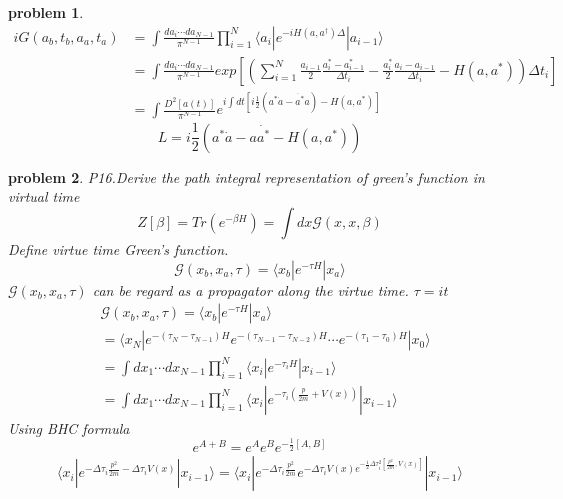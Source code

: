 \documentclass[a4paper,11pt]{article}
\newtheorem{problem}{problem}[subsection]
\begin{document}
\begin{problem}
\begin{equation*}
\begin{split}
     iG(a_b,t_b,a_a,t_a)&=\int\frac{da_i\cdots da_{N-1}}{\pi^{N-1}}\prod_{i=1}^{N}\langle a_i|e^{-iH(a,a^\dag)\Delta}|a_{i-1}\rangle\\
       &=\int\frac{da_i\cdots da_{N-1}}{\pi^{N-1}}exp\left[\left(\sum_{i=1}^{N}\frac{a_{i-1}}{2}\frac{a_i^*-a_{i-1}^*}{\Delta t_i}-\frac{a_i^*}{2}\frac{a_i-a_{i-1}}{\Delta t_i}-H(a,a^*)\right)\Delta t_i\right]\\
       &=\int\frac{D^2[a(t)]}{\pi^{N-1}}e^{i\int dt\left[i\frac{1}{2}(a^*\dot{a}-\dot{a^*}a)-H(a,a^*)\right]}
  \end{split}
\end{equation*}
\begin{equation*}
  L=i\frac{1}{2}(a^*\dot{a}-a\dot{a^*}-H(a,a^*))
\end{equation*}
\end{problem}
\begin{problem}
  P16.Derive the path integral representation of green's function in virtual time
  \begin{equation*}
    Z[\beta]=Tr(e^{-\beta H})=\int dx \mathcal{G}(x,x,\beta)
  \end{equation*}
  Define virtue time Green's function.
  \begin{equation*}
    \mathcal{G}(x_b,x_a,\tau)=\langle x_b|e^{-\tau H}|x_a\rangle
  \end{equation*}
  $\mathcal{G}(x_b,x_a,\tau)$ can be regard as a propagator along the virtue time. $\tau=it$
  \begin{equation*}
    \begin{split}
       &\mathcal{G}(x_b,x_a,\tau)=\langle x_b|e^{-\tau H}|x_a\rangle\\
         &=\langle x_N|e^{-(\tau_N-\tau_{N-1})H}e^{-(\tau_{N-1}-\tau_{N-2})H}\cdots e^{-(\tau_{1}-\tau_0)H}|x_0\rangle\\
         &=\int dx_1\cdots dx_{N-1}\prod_{i=1}^{N}\langle x_i|e^{-\tau_i H}|x_{i-1}\rangle\\
         &=\int dx_1\cdots dx_{N-1}\prod_{i=1}^{N}\langle x_i|e^{-\tau_i(\frac{p}{2m}+V(x))}|x_{i-1}\rangle
    \end{split}
  \end{equation*}
  Using BHC formula
  \begin{equation*}
    e^{A+B}=e^Ae^Be^{-\frac{1}{2}[A,B]}
  \end{equation*}
  \begin{equation*}
    \begin{split}
       \langle x_i|e^{-\Delta \tau_i\frac{p^2}{2m}-\Delta \tau_i V(x)}|x_{i-1}\rangle=\langle x_i|e^{-\Delta\tau_i\frac{p^2}{2m}}e^{-\Delta\tau_iV(x)e^{-\frac{1}{2}\Delta\tau_i^2[\frac{p^2}{2m},V(x)]}}|x_{i-1}\rangle

\end{split}
\end{equation*}
\end{problem}
\end{document}
